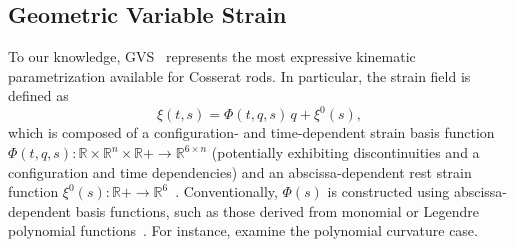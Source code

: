 \subsection{Geometric Variable Strain}
To our knowledge, \gls{GVS}~\citep{renda2020geometric, boyer2020dynamics, mathew2025reduced} represents the most expressive kinematic parametrization available for Cosserat rods. In particular, the strain field is defined as
\begin{equation}
    \xi(t,s) = \Phi(t,q,s) \, q + \xi^0(s),
\end{equation}
which is composed of a configuration- and time-dependent strain basis function $\Phi(t,q,s): \mathbb{R} \times \mathbb{R}^n \times \mathbb{R}+ \to \mathbb{R}^{6 \times n}$ (potentially exhibiting discontinuities and a configuration and time dependencies) and an abscissa-dependent rest strain function $\xi^0(s): \mathbb{R}+ \to \mathbb{R}^6$~\citep{mathew2025reduced}. Conventionally, $\Phi(s)$ is constructed using abscissa-dependent basis functions, such as those derived from monomial or Legendre polynomial functions~\citep{mathew2025reduced}. For instance, \citet{della2019control} examine the polynomial curvature case.

